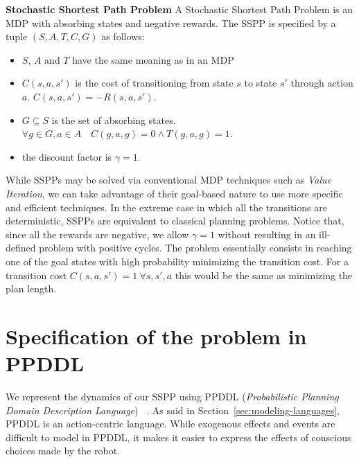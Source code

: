 \documentclass[../root.tex]{subfiles}
\begin{document}
\theoremstyle{definition}
\begin{definition}{\bfseries Stochastic Shortest Path Problem}
	A Stochastic Shortest Path Problem is an MDP with absorbing states and
	negative rewards. The SSPP is specified by a tuple $ (S, A, T, C, G) $ as
	follows:
	\begin{itemize}
		\item $ S $, $ A $ and $ T $  have the same meaning as in an MDP
		\item $ C(s, a, s') $ is the cost of transitioning from state $ s $
		to state $ s' $ through action $ a $.
		$ C(s, a, s') = -R(s, a, s') $.
		\item $ G \subseteq S $ is the set of absorbing states.
		$ \forall g \in G, a \in A \quad C(g,a,g) = 0 \land T(g,a,g) = 1 $.
		\item the discount factor is $ \gamma = 1 $.
	\end{itemize}
\end{definition}

While SSPPs may be solved via conventional MDP techniques such as
\emph{Value Iteration}, we can take advantage of their goal-based nature
to use more specific and efficient techniques. In the extreme case in which
all the transitions are deterministic, SSPPs are equivalent to classical
planning problems. Notice that, since all the rewards are negative, we allow
$ \gamma = 1 $ without resulting in an ill-defined problem with positive
cycles. The problem essentially consists in reaching one of the goal
states with high probability minimizing the transition cost. For a transition
cost $ C(s, a, s') = 1\ \forall s,s',a $ this would be the same as minimizing the plan length.

\section{Specification of the problem in PPDDL}

We represent the dynamics of our SSPP using PPDDL
(\emph{Probabilistic Planning Domain Description Language})%
~\cite{younes2004ppddl1}. As said in
Section~\ref{sec:modeling-languages}, PPDDL is an action-centric language.
While exogenous effects and events are difficult to model in PPDDL, it makes
it easier to express the effects of conscious choices made by the
robot.
\end{document}
